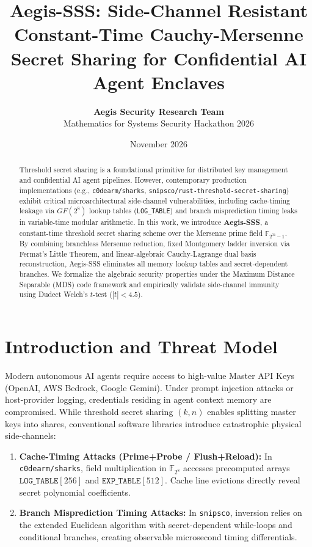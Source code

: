 \documentclass[11pt,a4paper]{article}
\title{\textbf{Aegis-SSS: Side-Channel Resistant Constant-Time Cauchy-Mersenne Secret Sharing for Confidential AI Agent Enclaves}}
\author{\textbf{Aegis Security Research Team} \\
Mathematics for Systems Security Hackathon 2026}
\date{November 2026}
\begin{document}
\maketitle

\begin{abstract}
Threshold secret sharing is a foundational primitive for distributed key management and confidential AI agent pipelines. However, contemporary production implementations (e.g., \texttt{c0dearm/sharks}, \texttt{snipsco/rust-threshold-secret-sharing}) exhibit critical microarchitectural side-channel vulnerabilities, including cache-timing leakage via $GF(2^8)$ lookup tables (\texttt{LOG\_TABLE}) and branch misprediction timing leaks in variable-time modular arithmetic. In this work, we introduce \textbf{Aegis-SSS}, a constant-time threshold secret sharing scheme over the Mersenne prime field $\mathbb{F}_{2^{31}-1}$. By combining branchless Mersenne reduction, fixed Montgomery ladder inversion via Fermat's Little Theorem, and linear-algebraic Cauchy-Lagrange dual basis reconstruction, Aegis-SSS eliminates all memory lookup tables and secret-dependent branches. We formalize the algebraic security properties under the Maximum Distance Separable (MDS) code framework and empirically validate side-channel immunity using Dudect Welch's $t$-test ($|t| < 4.5$).
\end{abstract}

\section{Introduction and Threat Model}
Modern autonomous AI agents require access to high-value Master API Keys (OpenAI, AWS Bedrock, Google Gemini). Under prompt injection attacks or host-provider logging, credentials residing in agent context memory are compromised. While threshold secret sharing $(k, n)$ enables splitting master keys into shares, conventional software libraries introduce catastrophic physical side-channels:
\begin{enumerate}
    \item \textbf{Cache-Timing Attacks (Prime+Probe / Flush+Reload):} In \texttt{c0dearm/sharks}, field multiplication in $\mathbb{F}_{2^8}$ accesses precomputed arrays $\mathtt{LOG\_TABLE}[256]$ and $\mathtt{EXP\_TABLE}[512]$. Cache line evictions directly reveal secret polynomial coefficients.
    \item \textbf{Branch Misprediction Timing Attacks:} In \texttt{snipsco}, inversion relies on the extended Euclidean algorithm with secret-dependent while-loops and conditional branches, creating observable microsecond timing differentials.
\end{enumerate}
\end{document}
